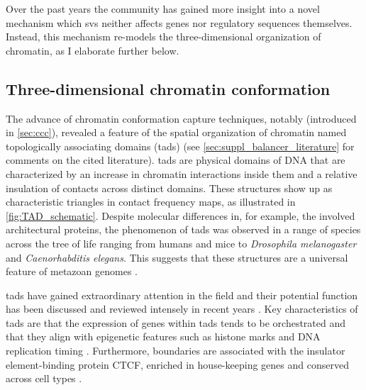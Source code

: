 Over the past years the community has gained more insight into a novel mechanism
which \acp{sv} neither affects genes nor regulatory sequences themselves.
Instead, this mechanism re-models the three-dimensional organization of
chromatin, as I elaborate further below.




\subsection{Three-dimensional chromatin conformation}
\label{sec:chromatin_conformation}


The advance of chromatin conformation capture techniques, notably \hic
(introduced in \cref{sec:ccc}), revealed a feature of the spatial organization
of chromatin named topologically associating domains (\acp{tad})
\citep{Dixon2012,Nora2012,Sexton2012,Rao2014} (see
\cref{sec:suppl_balancer_literature} for comments on the cited literature).
\Acp{tad} are physical domains of
DNA that are characterized by an increase in chromatin interactions inside them
and a relative insulation of contacts across distinct domains. These structures
show up as characteristic triangles in contact frequency maps, as illustrated in
\cref{fig:TAD_schematic}. Despite molecular differences in, for example,
the involved architectural proteins, the phenomenon of \acp{tad} was observed in
a range of species across the tree of life ranging from humans and mice to
\textit{Drosophila melanogaster} and \textit{Caenorhabditis elegans}. This suggests
that these structures are a universal feature of metazoan genomes
\citep{Dekker2015}.

\Acp{tad} have gained extraordinary attention in the field and their potential
function has been discussed and reviewed intensely in recent years
\citep[among others]{Gibcus2013,Gorkin2014,Sexton2015b,Hnisz2016a,Ruiz-Velasco2017}.
Key characteristics of \acp{tad} are that the expression of genes within
\acp{tad} tends to be orchestrated \citep[see figure 4b]{LeDily2014,Nora2012} and
that they align with epigenetic features such as histone marks \citep{Nora2012}
and DNA replication timing \citep{Pope2014,LeDily2014}. Furthermore, \tad
boundaries are associated with the insulator element-binding protein CTCF,
enriched in house-keeping genes and conserved across cell types
\citep{Dixon2012,Rao2014,Schmitt2016}.

